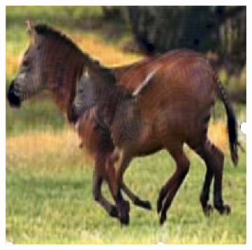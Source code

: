 \begin{figure}
\begin{subfigure}[t]{.2\textwidth}
  \end{subfigure}
  \begin{subfigure}[t]{.2\textwidth}
    \centering
    \includegraphics[width=\linewidth]{images/cycleGanResults/zebra_output1.png}
  \end{subfigure}

  \medskip


\end{figure}
